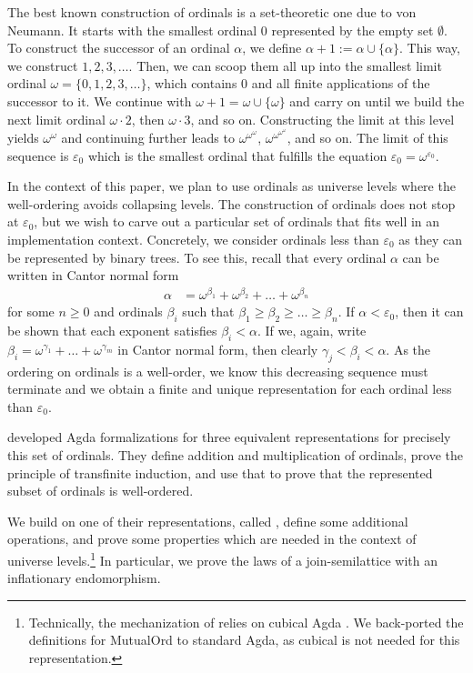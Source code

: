 \documentclass[manuscript,screen,review,anonymous]{acmart}
\begin{document}
{The best known construction of ordinals is a set-theoretic one due to
von Neumann. It starts with the smallest ordinal $0$ represented by
the empty set $\emptyset$. To construct the successor of an ordinal
$\alpha$, we define $\alpha+1  := \alpha \cup \{ \alpha \}$. This way,
we construct $1, 2, 3, \dots$. Then, we can scoop them all up into the
smallest limit ordinal $\omega = \{ 0, 1, 2, 3, \dots \}$, which
contains $0$ and all finite applications of the successor to it. We
continue with $\omega + 1 = \omega \cup \{ \omega \}$ and carry on
until we build the next limit ordinal $\omega \cdot 2$, then $\omega
\cdot 3$, and so on. Constructing the limit at this level yields
$\omega^\omega$ and continuing further leads to
$\omega^{\omega^\omega}$, $\omega^{\omega^{\omega^\omega}}$, and so
on. The limit of this sequence is $\varepsilon_0$ which is the
smallest ordinal that fulfills the equation
$\varepsilon_0 = \omega^{\varepsilon_0}$.

In the context of this paper, we plan to use
ordinals as universe levels where the well-ordering avoids collapsing
levels. The construction of ordinals does not stop at $\varepsilon_0$,
but we wish to carve out a particular set of ordinals that fits
well in an implementation context. Concretely, we consider ordinals
less than $\varepsilon_0$ as they can be represented by binary trees.
To see this, recall that every ordinal $\alpha$ can be written in
Cantor normal form
\begin{align*}
  \alpha &= \omega^{\beta_1} + \omega^{\beta_2}  + \dots + \omega^{\beta_n}
\end{align*}
for some $n\ge0$ and ordinals $\beta_i$ such that
$\beta_1\ge\beta_2\ge \dots \ge \beta_n$. If $\alpha < \varepsilon_0$,
then it can be shown that each exponent satisfies $\beta_i < \alpha$.
If we, again, write $\beta_i = \omega^{\gamma_1} + \dots +
\omega^{\gamma_m}$ in Cantor normal form, then clearly $\gamma_j <
\beta_i < \alpha$. As the ordering on ordinals is a well-order, we
know this decreasing sequence must terminate and we obtain a finite 
and unique representation for each ordinal less than $\varepsilon_0$.

\citet{DBLP:conf/cpp/ForsbergXG20} developed Agda
formalizations for three equivalent representations for precisely this
set of ordinals. They define addition and multiplication of ordinals,
prove the principle of transfinite induction, and use that to prove
that the represented subset of ordinals is well-ordered.

We build on one of their representations, called {\AMutualOrd}, define
some additional operations, and prove some properties which are needed
in the context of universe levels.\footnote{Technically, the
mechanization of \citet{DBLP:conf/cpp/ForsbergXG20} relies on
cubical Agda \cite{10.1145/3341691}. We back-ported the definitions for
MutualOrd to standard Agda, as cubical is not needed for this representation.}
In particular, we prove the laws of a join-semilattice with an
inflationary endomorphism.

}
\end{document}
